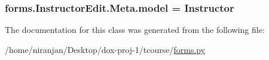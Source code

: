 \subsubsection[{\texorpdfstring{model}{model}}]{\setlength{\rightskip}{0pt plus 5cm}forms.\+Instructor\+Edit.\+Meta.\+model = {\bf Instructor}\hspace{0.3cm}{\ttfamily [static]}}\hypertarget{classforms_1_1_instructor_edit_1_1_meta_a65b4c8141e3c26664251fd11934e8318}{}\label{classforms_1_1_instructor_edit_1_1_meta_a65b4c8141e3c26664251fd11934e8318}


The documentation for this class was generated from the following file\+:\begin{DoxyCompactItemize}
\item 
/home/niranjan/\+Desktop/dox-\/proj-\/1/tcourse/\hyperlink{forms_8py}{forms.\+py}\end{DoxyCompactItemize}
